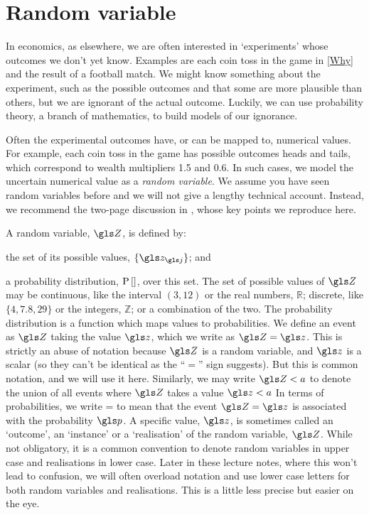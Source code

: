 \section{Random variable}
In economics, as elsewhere, we are often interested in `experiments' whose outcomes we don't yet know. Examples are each coin toss in the game in \cref{Why} and the result of a football match. We might know something about the experiment, such as the possible outcomes and that some are more plausible than others, but we are ignorant of the actual outcome. Luckily, we can use probability theory, a branch of mathematics, to build models of our ignorance.

Often the experimental outcomes have, or can be mapped to, numerical values. For example, each coin toss in the game has possible outcomes heads and tails, which correspond to wealth multipliers 1.5 and 0.6. In such cases, we model the uncertain numerical value as a \textit{random variable}. We assume you have seen random variables before and we will not give a lengthy technical account. Instead, we recommend the two-page discussion in \cite[p.~2]{vanKampen1992}, whose key points we reproduce here.

A random variable, $\Z$, is defined by:
\bi
\item the set of its possible values, $\{\z_\gj\}$; and
\item a probability distribution, $\mathrm{P}\left[\right]$, over this set.
\ei
The set of possible values of $\Z$ may be continuous, like the interval $(3,12)$ or the real numbers, 
$\mathbb{R}$; discrete, like $\{4, 7.8, 29\}$ or the integers, $\mathbb{Z}$; or a combination 
of the two. The probability distribution is a function which maps values to probabilities. We define an 
event as $\Z$ taking the value $\z$, which we write as $\Z=\z$. This is strictly an abuse
of notation because $\Z$ is a random variable, and $\z$ is a scalar (so they can't be identical as 
the ``$=$'' sign suggests). But this is common notation, and we will use it here. Similarly, we may write $\Z<a$
to denote the union of all events where $\Z$ takes a value $\z<a$ \etc
In terms of probabilities, we write
\be
\prob{\Z=\z}=\p
\ee
to mean that the event $\Z=\z$ is associated with the probability $\p$. A specific value, $\z$, 
is sometimes called an `outcome', an `instance' or a `realisation' of the random variable, $\Z$. 
While not obligatory, it is a common convention to denote random variables in upper case and 
realisations in lower case. Later in these lecture notes, where this won't lead to confusion, we will 
often overload notation and use lower case letters for both random variables and realisations. 
This is a little less precise but easier on the eye. 

